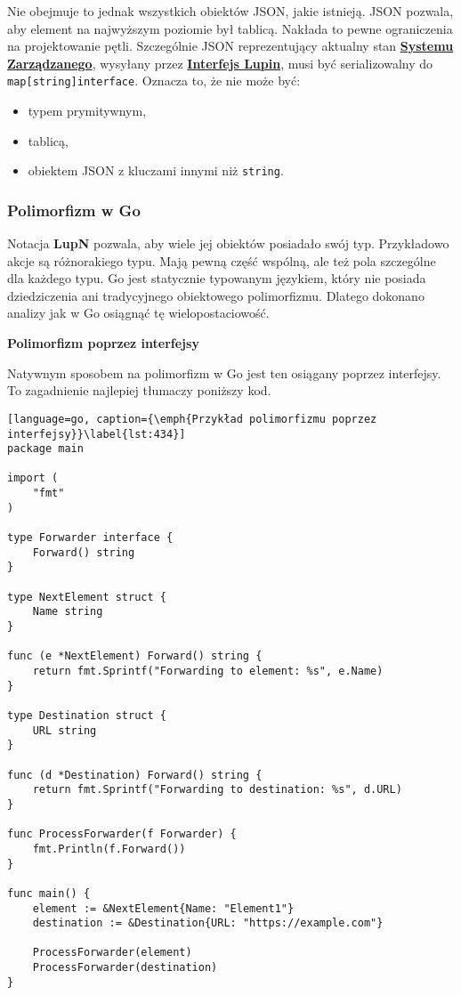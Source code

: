 Nie obejmuje to jednak wszystkich obiektów JSON, jakie istnieją. JSON pozwala, aby element na najwyższym poziomie był tablicą. Nakłada to pewne ograniczenia na projektowanie pętli. Szczególnie JSON reprezentujący aktualny stan \hyperlink{def:system-zarzadzany}{\textbf{Systemu Zarządzanego}}, wysyłany przez \hyperlink{def:interfejs-lupin}{\textbf{Interfejs Lupin}}, musi być serializowalny do \texttt{map[string]interface{}}. Oznacza to, że nie może być:
\begin{itemize}
    \item typem prymitywnym,
    \item tablicą,
    \item obiektem JSON z kluczami innymi niż \texttt{string}.
\end{itemize}


\subsubsection{Polimorfizm w Go}

Notacja \textbf{LupN} pozwala, aby wiele jej obiektów posiadało swój typ. Przykładowo akcje są różnorakiego typu. Mają pewną część wspólną, ale też pola szczególne dla każdego typu. Go jest statycznie typowanym językiem, który nie posiada dziedziczenia ani tradycyjnego obiektowego polimorfizmu. Dlatego dokonano analizy jak w Go osiągnąć tę wielopostaciowość.

\textbf{Polimorfizm poprzez interfejsy}

Natywnym sposobem na polimorfizm w Go jest ten osiągany poprzez interfejsy. To zagadnienie najlepiej tłumaczy poniższy kod.


\begin{lstlisting}[language=go, caption={\emph{Przykład polimorfizmu poprzez interfejsy}}\label{lst:434}]
package main

import (
	"fmt"
)

type Forwarder interface {
	Forward() string
}

type NextElement struct {
	Name string
}

func (e *NextElement) Forward() string {
	return fmt.Sprintf("Forwarding to element: %s", e.Name)
}

type Destination struct {
	URL string
}

func (d *Destination) Forward() string {
	return fmt.Sprintf("Forwarding to destination: %s", d.URL)
}

func ProcessForwarder(f Forwarder) {
	fmt.Println(f.Forward())
}

func main() {
	element := &NextElement{Name: "Element1"}
	destination := &Destination{URL: "https://example.com"}

	ProcessForwarder(element)
	ProcessForwarder(destination)
}
\end{lstlisting}

